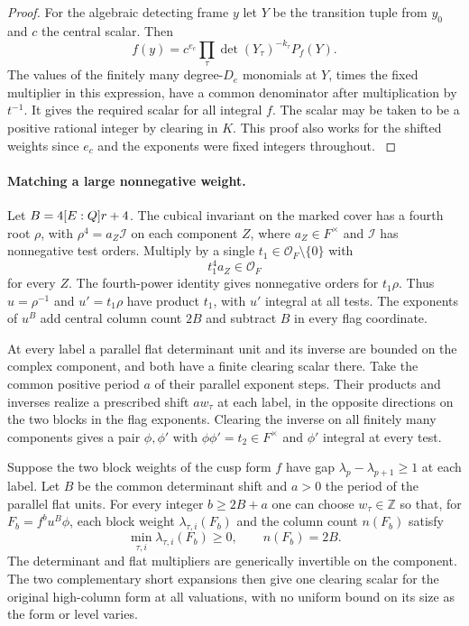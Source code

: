 \begin{proof}
For the algebraic detecting frame \(y\) let \(Y\) be the
transition tuple from \(y_0\) and \(c\) the central scalar.
Then
\[
 f(y)=c^{e_c}\prod_\tau\det(Y_\tau)^{-k_\tau}P_f(Y).
\]
The values of the finitely many degree-\(D_e\) monomials
at \(Y\), times the fixed multiplier in this expression,
have a common denominator after multiplication by \(t^{-1}\).
It gives the required scalar for all integral \(f\). The
scalar may be taken to be a positive rational integer
by clearing in \(K\). This proof also works for the shifted
weights since \(e_c\) and the exponents were fixed integers
throughout.
\label{cor:deep-cover-denominators-6}

\end{proof}

\paragraph{Matching a large nonnegative weight.}
Let \(B=4[E:Q]r+4\). The cubical invariant on the marked
cover has a fourth root \(\rho\), with \(\rho^4=a_Z\mathcal I\)
on each component \(Z\), where \(a_Z\in F^\times\) and
\(\mathcal I\) has nonnegative test orders. Multiply by a
single \(t_1\in\mathcal O_F\setminus\{0\}\) with
\[
 t_1^4a_Z\in\mathcal O_F
\]
for every \(Z\).
The fourth-power identity gives nonnegative orders for
\(t_1\rho\). Thus \(u=\rho^{-1}\) and \(u'=t_1\rho\) have
product \(t_1\), with \(u'\) integral at all tests.
The exponents of \(u^B\) add central column count \(2B\)
and subtract \(B\) in every flag coordinate.

At every label a parallel flat determinant unit and its
inverse are bounded on the complex component, and both
have a finite clearing scalar there. Take the common
positive period \(a\) of their parallel exponent steps.
Their products and inverses realize a prescribed shift
\(aw_\tau\) at each label, in the opposite directions on
the two blocks in the flag exponents. Clearing the
inverse on all finitely many components gives a pair
\(\phi,\phi'\) with \(\phi\phi'=t_2\in F^\times\) and
\(\phi'\) integral at every test.
\label{cor:deep-cover-denominators-7}

\begin{lemma}
\label{lem:deep-weight-shifts}
Suppose the two block weights of the cusp form \(f\) have
gap \(\lambda_p-\lambda_{p+1}\ge1\) at each label. Let \(B\) be
the common determinant shift and \(a>0\) the period of the parallel
flat units. For every integer \(b\ge2B+a\) one can choose \(w_\tau\in\mathbb Z\) so that, for \(F_b=f^bu^B\phi\), each block weight \(\lambda_{\tau,i}(F_b)\) and the column count \(n(F_b)\) satisfy
\[
 \min_{\tau,i}\lambda_{\tau,i}(F_b)\ge0,\qquad n(F_b)=2B.
\]
 The determinant and flat
multipliers are generically invertible on the component. The two complementary short
expansions then give one clearing scalar for the original
high-column form at all valuations, with no uniform bound on
its size as the form or level varies.
\end{lemma}

